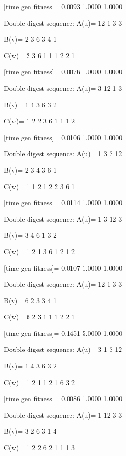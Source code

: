 [time gen fitness]=
    0.0093    1.0000    1.0000

Double digest sequence:
A(u)=
    12     1     3     3

B(v)=
     2     3     6     3     4     1

C(w)=
     2     3     6     1     1     1     2     2     1

[time gen fitness]=
    0.0076    1.0000    1.0000

Double digest sequence:
A(u)=
     3    12     1     3

B(v)=
     1     4     3     6     3     2

C(w)=
     1     2     2     3     6     1     1     1     2

[time gen fitness]=
    0.0106    1.0000    1.0000

Double digest sequence:
A(u)=
     1     3     3    12

B(v)=
     2     3     4     3     6     1

C(w)=
     1     1     2     1     2     2     3     6     1

[time gen fitness]=
    0.0114    1.0000    1.0000

Double digest sequence:
A(u)=
     1     3    12     3

B(v)=
     3     4     6     1     3     2

C(w)=
     1     2     1     3     6     1     2     1     2

[time gen fitness]=
    0.0107    1.0000    1.0000

Double digest sequence:
A(u)=
    12     1     3     3

B(v)=
     6     2     3     3     4     1

C(w)=
     6     2     3     1     1     1     2     2     1

[time gen fitness]=
    0.1451    5.0000    1.0000

Double digest sequence:
A(u)=
     3     1     3    12

B(v)=
     1     4     3     6     3     2

C(w)=
     1     2     1     1     2     1     6     3     2

[time gen fitness]=
    0.0086    1.0000    1.0000

Double digest sequence:
A(u)=
     1    12     3     3

B(v)=
     3     2     6     3     1     4

C(w)=
     1     2     2     6     2     1     1     1     3

